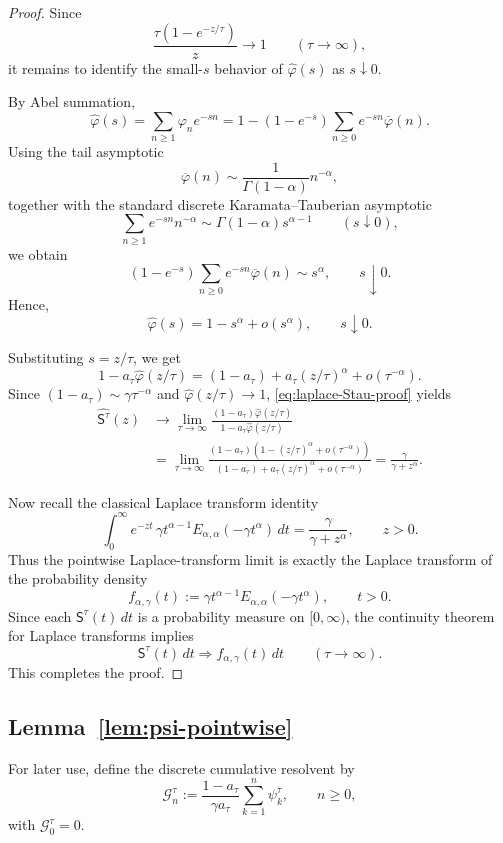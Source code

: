 \documentclass[letterpaper]{article}
\numberwithin{equation}{section}
\theoremstyle{definition}
\theoremstyle{remark}
\begin{document}
\begin{proof}
Since
\[
\frac{\tau(1-e^{-z/\tau})}{z}\to1
\qquad (\tau\to\infty),
\]
it remains to identify the small-$s$ behavior of $\hat\varphi(s)$ as $s\downarrow0$.

By Abel summation,
\[
\hat\varphi(s)
=
\sum_{n\ge1}\varphi_n e^{-sn}
=
1-(1-e^{-s})\sum_{n\ge0}e^{-sn}\overline\varphi(n).
\]
Using the tail asymptotic
\[
\overline\varphi(n)\sim \frac{1}{\Gamma(1-\alpha)}n^{-\alpha},
\]
together with the standard discrete Karamata--Tauberian asymptotic
\[
\sum_{n\ge1}e^{-sn}n^{-\alpha}\sim \Gamma(1-\alpha)s^{\alpha-1}
\qquad (s\downarrow0),
\]
we obtain
\[
(1-e^{-s})\sum_{n\ge0}e^{-sn}\overline\varphi(n)\sim s^\alpha,
\qquad s\downarrow0.
\]
Hence,
\[
\hat\varphi(s)=1-s^\alpha+o(s^\alpha),
\qquad s\downarrow0.
\]

Substituting $s=z/\tau$, we get
\[
1-a_\tau\hat\varphi(z/\tau)
=
(1-a_\tau)+a_\tau(z/\tau)^\alpha+o(\tau^{-\alpha}).
\]
Since $(1-a_\tau)\sim \gamma\tau^{-\alpha}$ and $\hat\varphi(z/\tau)\to1$, \eqref{eq:laplace-Stau-proof} yields
\begin{align*}
\widehat{\mathsf S^\tau}(z)
&\to
\lim_{\tau\to\infty}
\frac{(1-a_\tau)\hat\varphi(z/\tau)}
{1-a_\tau\hat\varphi(z/\tau)}
\\
&=
\lim_{\tau\to\infty}
\frac{(1-a_\tau)\left(1-(z/\tau)^\alpha+o(\tau^{-\alpha})\right)}
{(1-a_\tau)+a_\tau(z/\tau)^\alpha+o(\tau^{-\alpha})}
=
\frac{\gamma}{\gamma+z^\alpha}.
\end{align*}

Now recall the classical Laplace transform identity
\[
\int_0^\infty e^{-zt}\,\gamma t^{\alpha-1}E_{\alpha,\alpha}(-\gamma t^\alpha)\,dt
=
\frac{\gamma}{\gamma+z^\alpha},
\qquad z>0.
\]
Thus the pointwise Laplace-transform limit is exactly the Laplace transform of the probability density
\[
f_{\alpha,\gamma}(t):=\gamma t^{\alpha-1}E_{\alpha,\alpha}(-\gamma t^\alpha),
\qquad t>0.
\]
Since each $\mathsf S^\tau(t)\,dt$ is a probability measure on $[0,\infty)$, the continuity theorem for Laplace transforms implies
\[
\mathsf S^\tau(t)\,dt
\Rightarrow
f_{\alpha,\gamma}(t)\,dt
\qquad (\tau\to\infty).
\]
This completes the proof.
\end{proof}

\subsection{Lemma~\ref{lem:psi-pointwise}}\label{app:proof-psi-pointwise}

For later use, define the discrete cumulative resolvent by
\[
  \mathcal G_n^\tau
  :=
  \frac{1-a_\tau}{\gamma a_\tau}
  \sum_{k=1}^n\psi_k^\tau,
  \qquad n\ge0,
\]
with $\mathcal G_0^\tau=0$.
\end{document}
